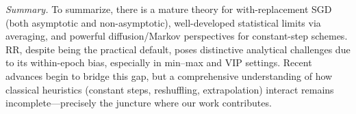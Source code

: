 


\medskip
\noindent\textit{Summary.} 
To summarize, there is a mature theory for with-replacement SGD (both asymptotic and non-asymptotic), well-developed statistical limits via averaging, and powerful diffusion/Markov perspectives for constant-step schemes. RR, despite being the practical default, poses distinctive analytical challenges due to its within-epoch bias, especially in min–max and VIP settings. Recent advances begin to bridge this gap, but a comprehensive understanding of how classical heuristics (constant steps, reshuffling, extrapolation) interact remains incomplete—precisely the juncture where our work contributes.
